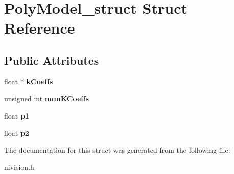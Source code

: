 \hypertarget{structPolyModel__struct}{
\section{PolyModel\_\-struct Struct Reference}
\label{structPolyModel__struct}
}
\subsection*{Public Attributes}
\begin{DoxyCompactItemize}
\item 
\hypertarget{structPolyModel__struct_a71029dd62db3692e83e94cc79e89d9a6}{
float $\ast$ {\bfseries kCoeffs}}
\label{structPolyModel__struct_a71029dd62db3692e83e94cc79e89d9a6}

\item 
\hypertarget{structPolyModel__struct_a3105c75057fabf5009d4fc2bebf78735}{
unsigned int {\bfseries numKCoeffs}}
\label{structPolyModel__struct_a3105c75057fabf5009d4fc2bebf78735}

\item 
\hypertarget{structPolyModel__struct_a9ac3cfb6e006d4e3dd3430c76910d50c}{
float {\bfseries p1}}
\label{structPolyModel__struct_a9ac3cfb6e006d4e3dd3430c76910d50c}

\item 
\hypertarget{structPolyModel__struct_ada13a1454aea01ac372a9093691ee8b1}{
float {\bfseries p2}}
\label{structPolyModel__struct_ada13a1454aea01ac372a9093691ee8b1}

\end{DoxyCompactItemize}


The documentation for this struct was generated from the following file:\begin{DoxyCompactItemize}
\item 
nivision.h\end{DoxyCompactItemize}
